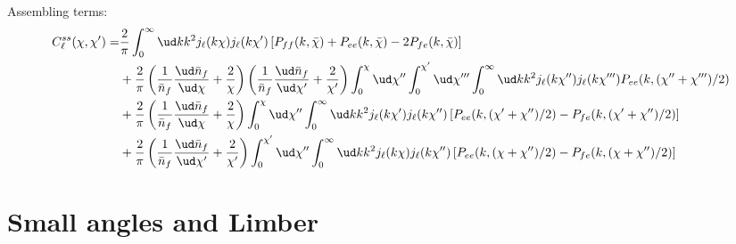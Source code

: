 \begin{widetext}
Assembling terms:
\begin{align}
C^{ss}_\ell(\chi,\chi') = &
    \frac{2}{\pi}
    \int_0^\infty\ud k k^2
    j_\ell(k\chi) j_{\ell}(k\chi')
    \left[ P_{ff}(k, \bar\chi)
    + P_{ee}(k, \bar\chi)
    - 2P_{fe}(k, \bar\chi) \right]
    \nonumber\\
    & +
    \frac{2}{\pi}
    \left(\frac{1}{\bar{n}_f}\frac{\ud \bar{n}_f}{\ud \chi}
    + \frac{2}{\chi} \right)
    \left(\frac{1}{\bar{n}_f}\frac{\ud \bar{n}_f}{\ud \chi'}
    + \frac{2}{\chi'} \right)
    \int_0^\chi\ud\chi''
    \int_0^{\chi'}\ud\chi'''
    \int_0^\infty\ud k k^2 j_\ell(k\chi'') j_{\ell}(k\chi''')
    P_{ee}(k, (\chi''+\chi''')/2)
    \nonumber\\
    & +
    \frac{2}{\pi}
    \left(\frac{1}{\bar{n}_f}\frac{\ud \bar{n}_f}{\ud \chi}
    + \frac{2}{\chi} \right)
    \int_0^\chi\ud\chi''
    \int_0^\infty\ud k k^2 
    j_\ell(k\chi') j_{\ell}(k\chi'')
    \left[ P_{ee}(k, (\chi' + \chi'')/2)
    - P_{fe}(k, (\chi' + \chi'')/2) \right]
    \nonumber\\
    & +
    \frac{2}{\pi}
    \left(\frac{1}{\bar{n}_f}\frac{\ud \bar{n}_f}{\ud \chi'}
    + \frac{2}{\chi'} \right)
    \int_0^{\chi'}\ud\chi''
    \int_0^\infty\ud k k^2 
    j_\ell(k\chi) j_{\ell}(k\chi'')
    \left[ P_{ee}(k, (\chi + \chi'')/2)
    - P_{fe}(k, (\chi + \chi'')/2) \right]
\end{align}

\section{Small angles and Limber}


\end{widetext}
